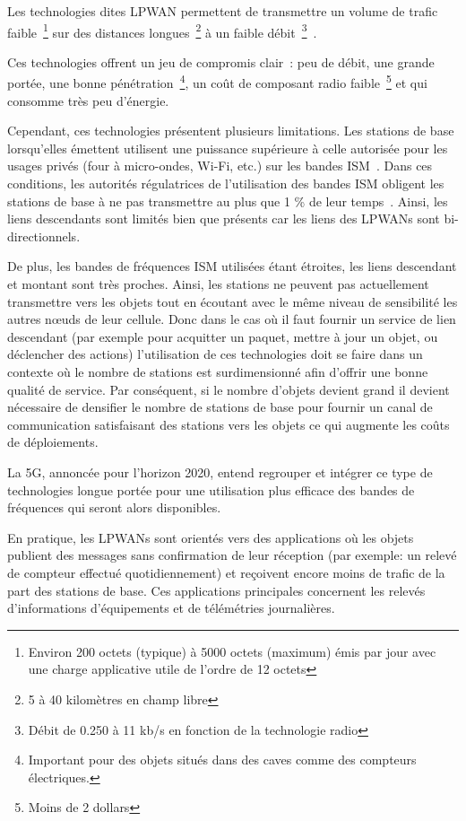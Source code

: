 Les technologies dites \ac{LPWAN} permettent de transmettre un volume de trafic faible~\footnote{Environ 200 octets (typique) à 5000 octets (maximum) émis par jour avec une charge applicative utile de l'ordre de 12 octets} sur des distances longues~\footnote{5 à 40 kilomètres en champ libre} à un faible débit~\footnote{Débit de 0.250 à 11 kb/s en fonction de la technologie radio}~\cite{xiong2015low}.

Ces technologies offrent un jeu de compromis clair~: peu de débit, une grande portée, une bonne pénétration~\footnote{Important pour des objets situés dans des caves comme des compteurs électriques.}, un coût de composant radio faible~\footnote{Moins de 2 dollars} et qui consomme très peu d'énergie.

Cependant, ces technologies présentent plusieurs limitations.
Les stations de base lorsqu'elles émettent utilisent une puissance supérieure à celle autorisée pour les usages privés (four à micro-ondes, Wi-Fi, etc.) sur les bandes \ac{ISM}~\cite{rec200170}.
Dans ces conditions, les autorités régulatrices de l'utilisation des bandes \ac{ISM} obligent les stations de base à ne pas transmettre au plus que 1 \% de leur temps~\cite{vangelista2015long}.
Ainsi, les liens descendants sont limités bien que présents car les liens des \ac{LPWAN}s sont bi-directionnels.

De plus, les bandes de fréquences \ac{ISM} utilisées étant étroites, les liens descendant et montant sont très proches.
Ainsi, les stations ne peuvent pas actuellement transmettre vers les objets tout en écoutant avec le même niveau de sensibilité les autres nœuds de leur cellule.
Donc dans le cas où il faut fournir un service de lien descendant (par exemple pour acquitter un paquet, mettre à jour un objet, ou déclencher des actions) l'utilisation de ces technologies doit se faire dans un contexte où le nombre de stations est surdimensionné afin d'offrir une bonne qualité de service.
Par conséquent, si le nombre d'objets devient grand il devient nécessaire de densifier le nombre de stations de base pour fournir un canal de communication satisfaisant des stations vers les objets ce qui augmente les coûts de déploiements.

La 5G, annoncée pour l'horizon 2020, entend regrouper et intégrer ce type de technologies longue portée pour une utilisation plus efficace des bandes de fréquences qui seront alors disponibles.

En pratique, les \ac{LPWAN}s sont orientés vers des applications où les objets publient des messages sans confirmation de leur réception (par exemple: un relevé de compteur effectué quotidiennement) et reçoivent encore moins de trafic de la part des stations de base.
Ces applications principales concernent les relevés d'informations d'équipements et de télémétries journalières.

